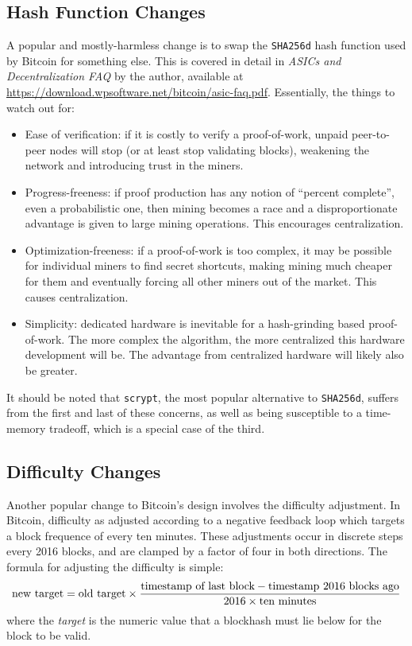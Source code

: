 \documentclass[letterpaper]{article}
\begin{document}
\subsection{Hash Function Changes}
A popular and mostly-harmless change is to
swap the \texttt{SHA256d} hash function used by Bitcoin for something else. This
is covered in detail in \emph{ASICs and Decentralization FAQ} by the author,
available at \url{https://download.wpsoftware.net/bitcoin/asic-faq.pdf}.
Essentially, the things to watch out for:
\begin{itemize}
\item Ease of verification: if it is costly to verify a proof-of-work, unpaid
peer-to-peer nodes will stop (or at least stop validating blocks), weakening
the network and introducing trust in the miners.
\item Progress-freeness: if proof production has any notion of ``percent
complete'', even a probabilistic one, then mining becomes a race and a disproportionate
advantage is given to large mining operations. This encourages centralization.
\item Optimization-freeness: if a proof-of-work is too complex, it may be possible
for individual miners to find secret shortcuts, making mining much cheaper for them
and eventually forcing all other miners out of the market. This causes centralization.
\item Simplicity: dedicated hardware is inevitable for a hash-grinding based
proof-of-work. The more complex the algorithm, the more centralized this hardware
development will be. The advantage from centralized hardware will likely also be
greater.
\end{itemize}
It should be noted that \texttt{scrypt}, the most popular alternative to
\texttt{SHA256d}, suffers from the first and last of these concerns, as
well as being susceptible to a time-memory tradeoff, which is a special
case of the third.

\subsection{Difficulty Changes}

Another popular change to Bitcoin's design involves the difficulty adjustment. In
Bitcoin, difficulty as adjusted according to a negative feedback loop which targets
a block frequence of every ten minutes. These adjustments occur in discrete steps
every 2016 blocks, and are clamped by a factor of four in both directions. The
formula for adjusting the difficulty is simple:
\[ \textnormal{new target} = \textnormal{old target}\times
   \frac{\textnormal{timestamp of last block} - \textnormal{timestamp 2016 blocks ago}}{2016\times\textnormal{ten minutes}} \]
where the \emph{target} is the numeric value that a blockhash must lie below for
the block to be valid.
\end{document}
